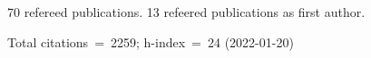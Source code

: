 70 refereed publications. 13 refeered publications as first author.

Total citations~=~2259; h-index~=~24 (2022-01-20)